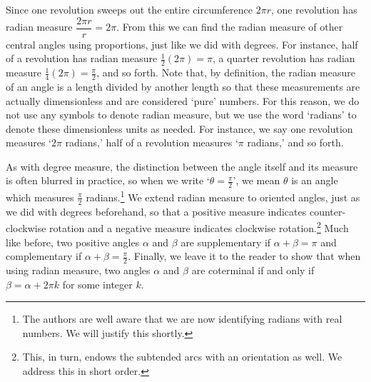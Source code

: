 \documentclass[12pt]{ximera}
\begin{document}
Since one revolution sweeps out the entire circumference $2\pi r$, one revolution has radian measure $\dfrac{2 \pi r}{r} = 2 \pi$.  From this we can find the radian measure of other central angles using proportions, just like we did with degrees.    For instance, half of a revolution has radian measure  $\frac{1}{2} (2 \pi) = \pi$, a quarter revolution has radian measure $\frac{1}{4} (2 \pi) = \frac{\pi}{2}$, and so forth.   Note that, by definition, the radian measure of an angle is a length divided by another length so that these measurements are actually dimensionless and are considered `pure' numbers. For this reason, we do not use any symbols to denote radian measure, but we use the word `radians' to denote these dimensionless units as needed. For instance, we say one revolution measures `$2\pi$ radians,' half of a revolution measures `$\pi$ radians,' and so forth.  

As with degree measure, the distinction between the angle itself and its measure is often blurred in practice, so when we write  `$\theta = \frac{\pi}{2}$', we mean $\theta$ is an angle which measures $\frac{\pi}{2}$ radians.\footnote{The authors are well aware that we are now identifying radians with real numbers.  We will justify this shortly.} We extend radian measure to oriented angles, just as we did with degrees beforehand, so that a positive measure indicates counter-clockwise rotation and a negative measure indicates clockwise rotation.\footnote{This, in turn, endows the subtended arcs with an orientation as well.  We address this in short order.}  Much like before, two positive angles $\alpha$ and $\beta$ are supplementary if $\alpha + \beta = \pi$ and complementary if $\alpha + \beta = \frac{\pi}{2}$.   Finally, we leave it to the reader to show that when using radian measure, two angles $\alpha$ and $\beta$ are coterminal if and only if $\beta = \alpha + 2\pi k$ for some integer $k$. 
\end{document}
